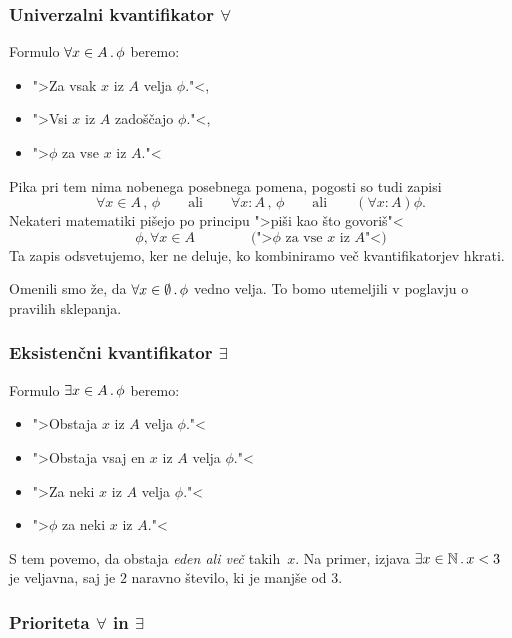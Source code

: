 \subsubsection{Univerzalni kvantifikator $\forall$}

Formulo $\forall x \in A \,.\, \phi$ beremo:
%
\begin{itemize}
\item ">Za vsak $x$ iz $A$ velja $\phi$."<,
\item ">Vsi $x$ iz $A$ zadoščajo $\phi$."<,
\item ">$\phi$ za vse $x$ iz $A$."<
\end{itemize}
%
Pika pri tem nima nobenega posebnega pomena, pogosti so tudi zapisi
%
\begin{equation*}
  \forall x \in A \,,\, \phi
  \qquad\text{ali}\qquad
  \forall x : A \,,\, \phi
  \qquad\text{ali}\qquad
  (\forall x : A) \phi.
\end{equation*}
%
Nekateri matematiki pišejo po principu ">piši kao što govoriš"<
%
\begin{equation*}
  \phi, \forall x \in A
  \qquad\qquad \text{(">$\phi$ za vse $x$ iz $A$"<)}
\end{equation*}
%
Ta zapis odsvetujemo, ker ne deluje, ko kombiniramo več kvantifikatorjev hkrati.

Omenili smo že, da $\forall x \in \emptyset \,.\, \phi$ vedno velja. To bomo utemeljili v poglavju o pravilih sklepanja.

\subsubsection{Eksistenčni kvantifikator $\exists$}

Formulo $\exists x \in A \,.\, \phi$ beremo:
%
\begin{itemize}
\item ">Obstaja $x$ iz $A$ velja $\phi$."<
\item ">Obstaja vsaj en $x$ iz $A$ velja $\phi$."<
\item ">Za neki $x$ iz $A$ velja $\phi$."<
\item ">$\phi$ za neki $x$ iz $A$."<
\end{itemize}
%
S tem povemo, da obstaja \emph{eden ali več} takih~$x$. Na primer, izjava $\exists x \in \mathbb{N} \,.\, x
< 3$ je veljavna, saj je $2$ naravno število, ki je manjše od $3$.


\subsubsection{Prioriteta $\forall$ in $\exists$}

